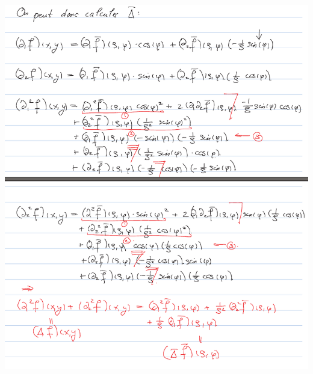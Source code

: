 \documentclass[12pt,a4paper]{article}
\begin{document}
\begin{enumerate}[label=\roman*)]
\begin{center}
				\includegraphics[scale=0.7]{images/ainsi}
			\end{center}
\end{enumerate}
\end{document}
